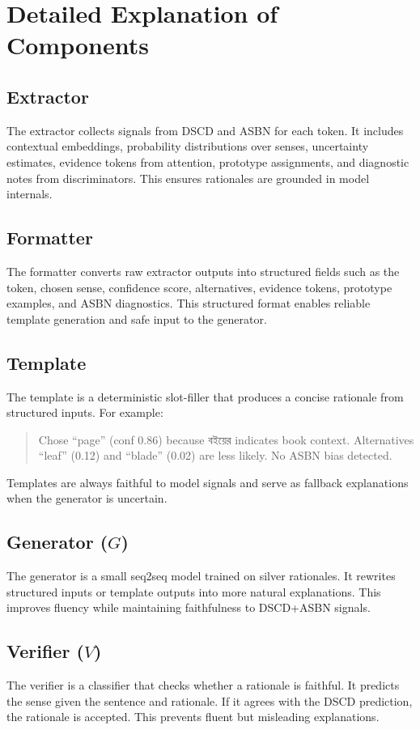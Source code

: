 \documentclass[a4paper,11pt]{article}
\begin{document}
\section{Detailed Explanation of Components}

\subsection{Extractor}
The extractor collects signals from DSCD and ASBN for each token. It includes contextual embeddings, probability distributions over senses, uncertainty estimates, evidence tokens from attention, prototype assignments, and diagnostic notes from discriminators. This ensures rationales are grounded in model internals.

\subsection{Formatter}
The formatter converts raw extractor outputs into structured fields such as the token, chosen sense, confidence score, alternatives, evidence tokens, prototype examples, and ASBN diagnostics. This structured format enables reliable template generation and safe input to the generator.

\subsection{Template}
The template is a deterministic slot-filler that produces a concise rationale from structured inputs. For example:
\begin{quote}
Chose ``page'' (conf 0.86) because {\bengalifont বইয়ের} indicates book context. Alternatives ``leaf'' (0.12) and ``blade'' (0.02) are less likely. No ASBN bias detected.
\end{quote}
Templates are always faithful to model signals and serve as fallback explanations when the generator is uncertain.

\subsection{Generator ($G$)}
The generator is a small seq2seq model trained on silver rationales. It rewrites structured inputs or template outputs into more natural explanations. This improves fluency while maintaining faithfulness to DSCD+ASBN signals.

\subsection{Verifier ($V$)}
The verifier is a classifier that checks whether a rationale is faithful. It predicts the sense given the sentence and rationale. If it agrees with the DSCD prediction, the rationale is accepted. This prevents fluent but misleading explanations.
\end{document}

